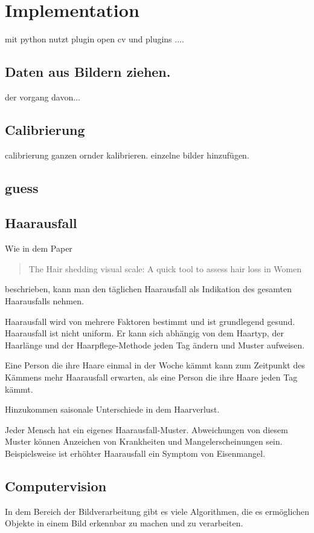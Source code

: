 \documentclass[german,a4paper,12pt]{llncs}
\begin{document}
\section{Implementation}

mit python
nutzt plugin open cv und plugins ....

\subsection{Daten aus Bildern ziehen.}
der vorgang davon...
\subsection{Calibrierung}
calibrierung
ganzen ornder kalibrieren. einzelne bilder hinzufügen.
\subsection{guess}





\subsection{Haarausfall}
Wie in dem Paper \blockquote{The Hair shedding visual scale: A quick tool to assess hair loss in Women} beschrieben, kann man den täglichen Haarausfall als Indikation des gesamten Haarausfalls nehmen.\cite{visualScale}

Haarausfall wird von mehrere Faktoren bestimmt und ist grundlegend gesund. Haarausfall ist nicht uniform. Er kann sich abhängig von dem Haartyp, der Haarlänge und der Haarpflege-Methode jeden Tag ändern und Muster aufweisen. 

Eine Person die ihre Haare einmal in der Woche kämmt kann zum Zeitpunkt des Kämmens mehr Haarausfall erwarten, als eine Person die ihre Haare jeden Tag kämmt. 

Hinzukommen saisonale Unterschiede in dem Haarverlust.\cite{seasoalShedding}

Jeder Mensch hat ein eigenes Haarausfall-Muster. Abweichungen von diesem Muster können Anzeichen von Krankheiten und Mangelerscheinungen sein. Beispielsweise ist erhöhter Haarausfall ein Symptom von Eisenmangel.\cite{ironDeficiency}

\subsection{Computervision}
In dem Bereich der Bildverarbeitung gibt es viele Algorithmen, die es ermöglichen Objekte in einem Bild erkennbar zu machen und zu verarbeiten.
\end{document}
